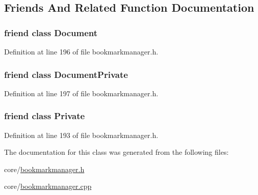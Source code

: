 \subsection{Friends And Related Function Documentation}
\hypertarget{classOkular_1_1BookmarkManager_a883538034e58fc5c0de7d4e4cab3cef7}{
\subsubsection[{Document}]{\setlength{\rightskip}{0pt plus 5cm}friend class {\bf Document}\hspace{0.3cm}{\ttfamily [friend]}}}\label{classOkular_1_1BookmarkManager_a883538034e58fc5c0de7d4e4cab3cef7}


Definition at line 196 of file bookmarkmanager.\+h.

\hypertarget{classOkular_1_1BookmarkManager_ad60d3d11afe13773e689a27dbaba5d11}{
\subsubsection[{Document\+Private}]{\setlength{\rightskip}{0pt plus 5cm}friend class {\bf Document\+Private}\hspace{0.3cm}{\ttfamily [friend]}}}\label{classOkular_1_1BookmarkManager_ad60d3d11afe13773e689a27dbaba5d11}


Definition at line 197 of file bookmarkmanager.\+h.

\hypertarget{classOkular_1_1BookmarkManager_ac96b60d37bd806132da680e187dc2288}{
\subsubsection[{Private}]{\setlength{\rightskip}{0pt plus 5cm}friend class {\bf Private}\hspace{0.3cm}{\ttfamily [friend]}}}\label{classOkular_1_1BookmarkManager_ac96b60d37bd806132da680e187dc2288}


Definition at line 193 of file bookmarkmanager.\+h.



The documentation for this class was generated from the following files\+:\begin{DoxyCompactItemize}
\item 
core/\hyperlink{bookmarkmanager_8h}{bookmarkmanager.\+h}\item 
core/\hyperlink{bookmarkmanager_8cpp}{bookmarkmanager.\+cpp}\end{DoxyCompactItemize}
